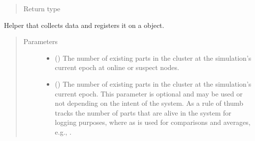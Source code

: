 \documentclass[letterpaper,10pt,english]{sphinxmanual}
\begin{document}
\begin{fulllineitems}
\begin{fulllineitems}
\begin{quote}
\begin{description}
\item[{Return type}] \leavevmode
{\hyperref[\detokenize{app:app.type_hints.NodeDict}]{}}

\end{description}\end{quote}

\end{fulllineitems}


\begin{fulllineitems}
\label{\detokenize{app.domain:app.domain.cluster_groups.Cluster._log_evaluation}}
Helper that collects  data and registers it on a
{\hyperref[\detokenize{app.domain.helpers:app.domain.helpers.smart_dataclasses.LoggingData}]{}}
object.
\begin{quote}\begin{description}
\item[{Parameters}] \leavevmode\begin{itemize}
\item {} 
 () \textendash{} The number of existing parts in the cluster at the
simulation’s current epoch at online or suspect nodes.

\item {} 
 () \textendash{} The number of existing parts in the cluster at the
simulation’s current epoch. This parameter is optional and
may be used or not depending on the intent of the system.
As a rule of thumb  tracks the number of parts that
are alive in the system for logging purposes, where as
 is used for comparisons and averages, e.g.,
{\hyperref[\detokenize{app.domain:app.domain.cluster_groups.SGCluster.evaluate}]{}}.


\end{itemize}
\end{description}
\end{quote}
\end{fulllineitems}
\end{fulllineitems}
\end{document}
